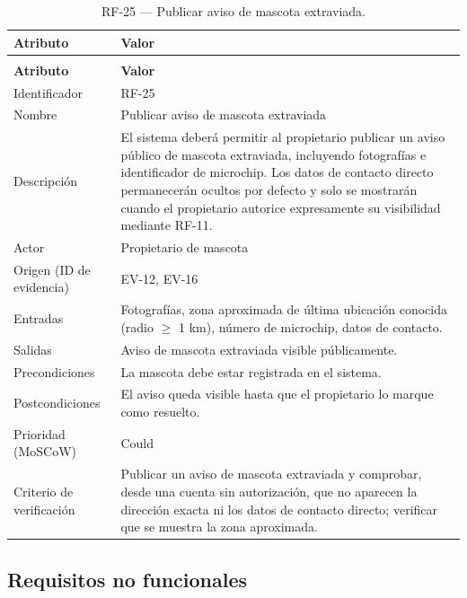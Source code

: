 \documentclass[journal,onecolumn]{IEEEtran}
\makeatletter
\newenvironment{atributos}[2]{%
	\small
	\begin{longtable}{@{}>{\raggedright\arraybackslash}p{4.2cm} >{\raggedright\arraybackslash}p{11.2cm}@{}}
		\caption{#2}\label{tab:#1}\\
		\toprule
		\textbf{Atributo} & \textbf{Valor} \\
		\midrule
		\endfirsthead
		\multicolumn{2}{@{}l}{\small\itshape (continuación)}\\
		\toprule
		\textbf{Atributo} & \textbf{Valor} \\
		\midrule
		\endhead
		\bottomrule
		\endlastfoot
	}{%
	\end{longtable}
	\normalsize
}
\makeatother
\begin{document}
	\begin{atributos}{RF-25}{RF-25 --- Publicar aviso de mascota extraviada.}
		Identificador & RF-25 \\
		Nombre & Publicar aviso de mascota extraviada \\
		Descripción & El sistema deberá permitir al propietario publicar un aviso público de mascota extraviada, incluyendo fotografías e identificador de microchip. Los datos de contacto directo permanecerán ocultos por defecto y solo se mostrarán cuando el propietario autorice expresamente su visibilidad mediante RF-11. \\
		Actor & Propietario de mascota \\
		Origen (ID de evidencia) & EV-12, EV-16 \\
		Entradas & Fotografías, zona aproximada de última ubicación conocida (radio $\geq$ 1 km), número de microchip, datos de contacto. \\
		Salidas & Aviso de mascota extraviada visible públicamente. \\
		Precondiciones & La mascota debe estar registrada en el sistema. \\
		Postcondiciones & El aviso queda visible hasta que el propietario lo marque como resuelto. \\
		Prioridad (MoSCoW) & Could \\
		Criterio de verificación & Publicar un aviso de mascota extraviada y comprobar, desde una cuenta sin autorización, que no aparecen la dirección exacta ni los datos de contacto directo; verificar que se muestra la zona aproximada. \\
	\end{atributos}
	
	\subsection{Requisitos no funcionales}
	\label{sec:rnf}
	
\end{document}
